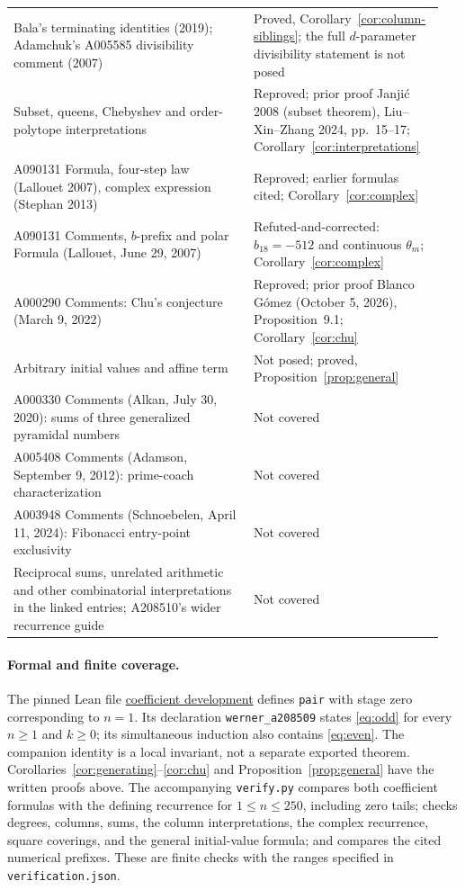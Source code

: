 \documentclass[11pt]{article}
\begin{document}
{\begin{longtable}{@{}>{\raggedright\arraybackslash}p{0.53\linewidth}>{\raggedright\arraybackslash}p{0.42\linewidth}@{}}
Bala's terminating identities (2019); Adamchuk's A005585 divisibility
comment (2007) & Proved, Corollary~\ref{cor:column-siblings}; the full
$d$-parameter divisibility statement is not posed\\
Subset, queens, Chebyshev and order-polytope interpretations & Reproved;
prior proof Janji\'c 2008 (subset theorem), Liu--Xin--Zhang 2024,
pp.~15--17; Corollary~\ref{cor:interpretations}\\
A090131 Formula, four-step law (Lallouet 2007), complex expression
(Stephan 2013) & Reproved; earlier formulas cited;
Corollary~\ref{cor:complex}\\
A090131 Comments, $b$-prefix and polar Formula (Lallouet, June 29, 2007) &
Refuted-and-corrected: $b_{18}=-512$ and continuous $\theta_m$;
Corollary~\ref{cor:complex}\\
A000290 Comments: Chu's conjecture (March 9, 2022) & Reproved;
prior proof Blanco G\'omez (October 5, 2026), Proposition~9.1;
Corollary~\ref{cor:chu}\\
Arbitrary initial values and affine term & Not posed; proved,
Proposition~\ref{prop:general}\\
A000330 Comments (Alkan, July 30, 2020): sums of three generalized
pyramidal numbers & Not covered\\
A005408 Comments (Adamson, September 9, 2012): prime-coach characterization &
Not covered\\
A003948 Comments (Schnoebelen, April 11, 2024): Fibonacci entry-point
exclusivity & Not covered\\
Reciprocal sums, unrelated arithmetic and other combinatorial
interpretations in the linked entries; A208510's wider recurrence guide & Not covered\\
\bottomrule
\end{longtable}}

\paragraph{Formal and finite coverage.}
The pinned Lean file
\href{https://github.com/the-omega-institute/trureturing/blob/6ffa76e4424ce4c0d1048e56afb0724762ed8285/D5/S1/Recurrence/Invariants/AffinePolynomialPairBinomialCoefficients.lean}{coefficient development}
defines \texttt{pair} with stage zero corresponding to $n=1$.
Its declaration \texttt{werner\_a208509} states \eqref{eq:odd} for every
$n\geq1$ and $k\geq0$; its simultaneous induction also contains
\eqref{eq:even}. The companion identity is a local invariant, not a separate
exported theorem. Corollaries~\ref{cor:generating}--\ref{cor:chu} and
Proposition~\ref{prop:general} have the written proofs above.
The accompanying \texttt{verify.py} compares both coefficient formulas with
the defining recurrence for $1\leq n\leq250$, including zero tails; checks
degrees, columns, sums, the column interpretations, the complex recurrence,
square coverings, and the general initial-value formula; and compares
the cited numerical prefixes. These are finite checks with the ranges
specified in \texttt{verification.json}.
\end{document}
